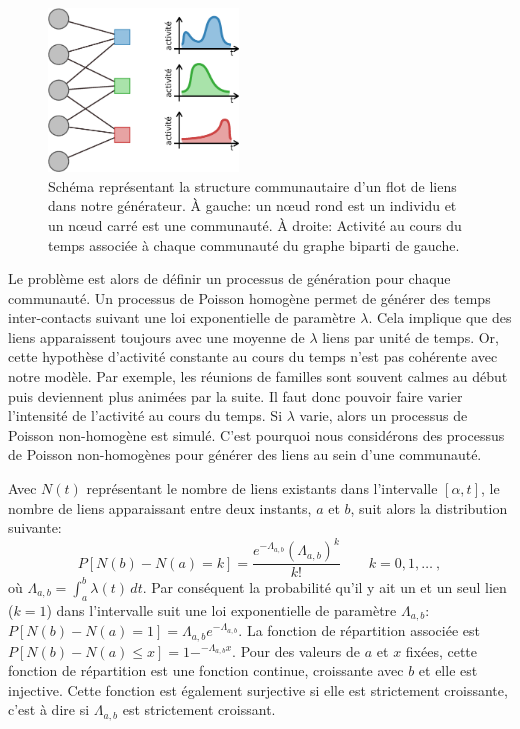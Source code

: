 \begin{figure}
\centering
\includegraphics[width=0.45\textwidth]{img/Qualite/Generator}
\caption{Schéma représentant la structure communautaire d'un flot de liens dans notre générateur.
\`A gauche: un n\oe{}ud rond est un individu et un n\oe{}ud carré est une communauté.
\`A droite: Activité au cours du temps associée à chaque communauté du graphe biparti de gauche.}
\label{fig:qualite_Generator}
\end{figure}

Le problème est alors de définir un processus de génération pour chaque communauté.
Un processus de Poisson homogène permet de générer des temps inter-contacts suivant une loi exponentielle de paramètre $\lambda$.
Cela implique que des liens apparaissent toujours avec une moyenne de $\lambda$ liens par unité de temps.
Or, cette hypothèse d'activité constante au cours du temps n'est pas cohérente avec notre modèle.
Par exemple, les réunions de familles sont souvent calmes au début puis deviennent plus animées par la suite.
Il faut donc pouvoir faire varier l'intensité de l'activité au cours du temps.
Si $\lambda$ varie, alors un processus de Poisson non-homogène est simulé.
C'est pourquoi nous considérons des processus de Poisson non-homogènes pour générer des liens au sein d'une communauté.

\bigskip

Avec $N(t)$ représentant le nombre de liens existants dans l'intervalle $[\alpha,t]$, le nombre de liens apparaissant entre deux instants, $a$ et $b$, suit alors la distribution suivante:
\begin{equation}
P [N(b) - N(a) = k] = \frac{e^{-\Lambda_{a,b}} (\Lambda_{a,b})^k}{k!} \qquad k= 0,1,\ldots \ ,
\end{equation}
où $\Lambda_{a,b}=\int_a^b \lambda(t)\,dt$.
Par conséquent la probabilité qu'il y ait un et un seul lien ($k=1$) dans l'intervalle suit une loi exponentielle de paramètre $\Lambda_{a,b}$: $P [N(b) - N(a) = 1]=\Lambda_{a,b}e^{-\Lambda_{a,b}}$.
La fonction de répartition associée est $P [N(b) - N(a) \leq x]= 1 - ^{-\Lambda_{a,b}x}$.
Pour des valeurs de $a$ et $x$ fixées, cette fonction de répartition est une fonction continue, croissante avec $b$ et elle est injective.
Cette fonction est également surjective si elle est strictement croissante, c'est à dire si $\Lambda_{a,b}$ est strictement croissant.

